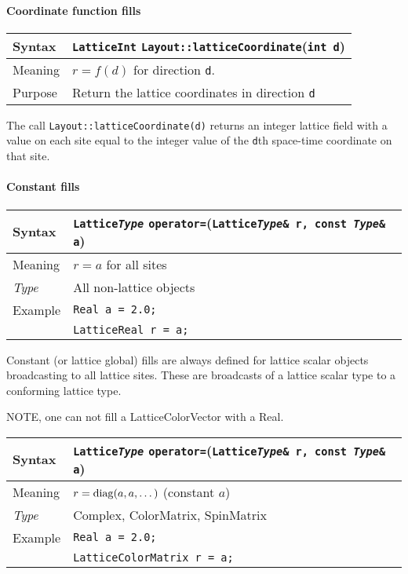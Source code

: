 \documentclass[12pt,letterpaper]{article}
\newcommand{\diag}{\mathop{\rm diag}}
\newcommand{\tLatticeReal}{LatticeReal}
\newcommand{\tLatticeInt}{LatticeInt}
\newcommand{\tLatticeColorMatrix}{LatticeColorMatrix}
\newcommand{\tReal}{Real}
\newcommand{\tComplex}{Complex}
\newcommand{\tColorMatrix}{ColorMatrix}
\newcommand{\tSpinMatrix}{SpinMatrix}
\newcommand{\tLatticeColorVector}{LatticeColorVector}
\newcommand{\itt}{\it Type}
\begin{document}
\paragraph{Coordinate function fills}

\begin{flushleft}
  \begin{tabular}{|l|l|}
  \hline
  Syntax      & {\tt \tLatticeInt} \verb|Layout::latticeCoordinate|({\tt int d})\\
  \hline
  Meaning     & $r = f(d)$ for direction \verb|d|.\\
  \hline
  Purpose     & Return the lattice coordinates in direction \verb|d|\\
  \hline
  \end{tabular}
\end{flushleft}
%
The call \verb|Layout::latticeCoordinate(d)| returns an integer lattice field with a
value on each site equal to the integer value of the \verb|d|th
space-time coordinate on that site.

\paragraph{Constant fills}

\begin{flushleft}
  \begin{tabular}{|l|l|}
  \hline
  Syntax      & {\tt Lattice{\it Type}} \verb|operator=|({\tt Lattice{\it Type}\& r, const {\it Type}\& a})\\
  \hline
  Meaning     & $r = a$ for all sites\\
  \hline
  \itt        & All non-lattice objects \\
  \hline
  Example     & {\tt \tReal{} a = 2.0;}\\
              & {\tt \tLatticeReal{} r = a;}\\
  \hline
  \end{tabular}
\end{flushleft}

Constant (or lattice global) fills are always defined for lattice scalar objects broadcasting to
all lattice sites. These are broadcasts of a lattice scalar type to a conforming lattice type.

NOTE, one can not fill a \tLatticeColorVector{} with a \tReal.

\begin{flushleft}
  \begin{tabular}{|l|l|}
  \hline
  Syntax      & {\tt Lattice{\it Type}} \verb|operator=|({\tt Lattice{\it Type}\& r, const {\it Type}\& a})\\
  \hline
  Meaning     & $r = \diag(a,a,\ldots{})$ (constant $a$)\\
  \hline
  \itt        & \tComplex, \tColorMatrix, \tSpinMatrix \\
  \hline
  Example     & {\tt \tReal{} a = 2.0;}\\
              & {\tt \tLatticeColorMatrix{} r = a;}\\
  \hline
  \end{tabular}
\end{flushleft}
\end{document}
